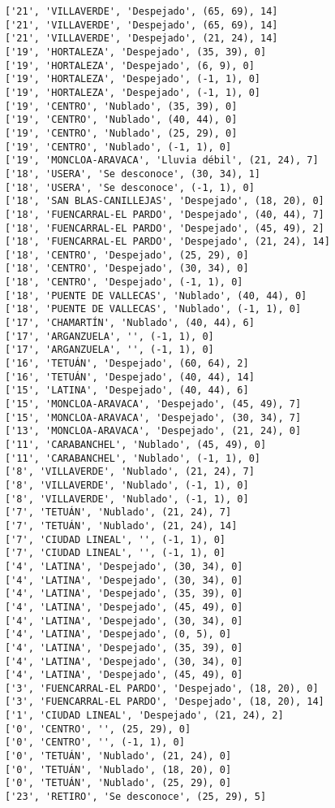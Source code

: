 \documentclass[11pt]{article}
\begin{document}
\begin{Verbatim}[commandchars=\\\{\}]
['21', 'VILLAVERDE', 'Despejado', (65, 69), 14]
['21', 'VILLAVERDE', 'Despejado', (65, 69), 14]
['21', 'VILLAVERDE', 'Despejado', (21, 24), 14]
['19', 'HORTALEZA', 'Despejado', (35, 39), 0]
['19', 'HORTALEZA', 'Despejado', (6, 9), 0]
['19', 'HORTALEZA', 'Despejado', (-1, 1), 0]
['19', 'HORTALEZA', 'Despejado', (-1, 1), 0]
['19', 'CENTRO', 'Nublado', (35, 39), 0]
['19', 'CENTRO', 'Nublado', (40, 44), 0]
['19', 'CENTRO', 'Nublado', (25, 29), 0]
['19', 'CENTRO', 'Nublado', (-1, 1), 0]
['19', 'MONCLOA-ARAVACA', 'Lluvia débil', (21, 24), 7]
['18', 'USERA', 'Se desconoce', (30, 34), 1]
['18', 'USERA', 'Se desconoce', (-1, 1), 0]
['18', 'SAN BLAS-CANILLEJAS', 'Despejado', (18, 20), 0]
['18', 'FUENCARRAL-EL PARDO', 'Despejado', (40, 44), 7]
['18', 'FUENCARRAL-EL PARDO', 'Despejado', (45, 49), 2]
['18', 'FUENCARRAL-EL PARDO', 'Despejado', (21, 24), 14]
['18', 'CENTRO', 'Despejado', (25, 29), 0]
['18', 'CENTRO', 'Despejado', (30, 34), 0]
['18', 'CENTRO', 'Despejado', (-1, 1), 0]
['18', 'PUENTE DE VALLECAS', 'Nublado', (40, 44), 0]
['18', 'PUENTE DE VALLECAS', 'Nublado', (-1, 1), 0]
['17', 'CHAMARTÍN', 'Nublado', (40, 44), 6]
['17', 'ARGANZUELA', '', (-1, 1), 0]
['17', 'ARGANZUELA', '', (-1, 1), 0]
['16', 'TETUÁN', 'Despejado', (60, 64), 2]
['16', 'TETUÁN', 'Despejado', (40, 44), 14]
['15', 'LATINA', 'Despejado', (40, 44), 6]
['15', 'MONCLOA-ARAVACA', 'Despejado', (45, 49), 7]
['15', 'MONCLOA-ARAVACA', 'Despejado', (30, 34), 7]
['13', 'MONCLOA-ARAVACA', 'Despejado', (21, 24), 0]
['11', 'CARABANCHEL', 'Nublado', (45, 49), 0]
['11', 'CARABANCHEL', 'Nublado', (-1, 1), 0]
['8', 'VILLAVERDE', 'Nublado', (21, 24), 7]
['8', 'VILLAVERDE', 'Nublado', (-1, 1), 0]
['8', 'VILLAVERDE', 'Nublado', (-1, 1), 0]
['7', 'TETUÁN', 'Nublado', (21, 24), 7]
['7', 'TETUÁN', 'Nublado', (21, 24), 14]
['7', 'CIUDAD LINEAL', '', (-1, 1), 0]
['7', 'CIUDAD LINEAL', '', (-1, 1), 0]
['4', 'LATINA', 'Despejado', (30, 34), 0]
['4', 'LATINA', 'Despejado', (30, 34), 0]
['4', 'LATINA', 'Despejado', (35, 39), 0]
['4', 'LATINA', 'Despejado', (45, 49), 0]
['4', 'LATINA', 'Despejado', (30, 34), 0]
['4', 'LATINA', 'Despejado', (0, 5), 0]
['4', 'LATINA', 'Despejado', (35, 39), 0]
['4', 'LATINA', 'Despejado', (30, 34), 0]
['4', 'LATINA', 'Despejado', (45, 49), 0]
['3', 'FUENCARRAL-EL PARDO', 'Despejado', (18, 20), 0]
['3', 'FUENCARRAL-EL PARDO', 'Despejado', (18, 20), 14]
['1', 'CIUDAD LINEAL', 'Despejado', (21, 24), 2]
['0', 'CENTRO', '', (25, 29), 0]
['0', 'CENTRO', '', (-1, 1), 0]
['0', 'TETUÁN', 'Nublado', (21, 24), 0]
['0', 'TETUÁN', 'Nublado', (18, 20), 0]
['0', 'TETUÁN', 'Nublado', (25, 29), 0]
['23', 'RETIRO', 'Se desconoce', (25, 29), 5]

\end{Verbatim}
\end{document}
